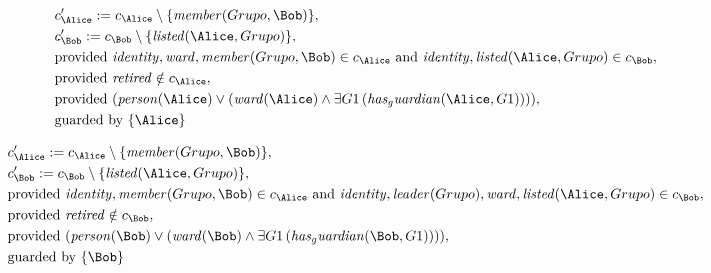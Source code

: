\begin{align*}
&
c'_
{
\Alice
}
 := 
c_
{
\Alice
}
 \setminus 
\{
\mathit{
member
}
(
Grupo
,
\Bob
)
\}
,\\
&
c'_
{
\Bob
}
 := 
c_
{
\Bob
}
 \setminus 
\{
\mathit{
listed
}
(
\Alice
,
Grupo
)
\}
,\\
&
\text{provided } 
\mathit{
identity
}
,
\mathit{
ward
}
,
\mathit{
member
}
(
Grupo
,
\Bob
)
 \in c_
{
\Alice
}
 \text{ and } 
\mathit{
identity
}
,
\mathit{
listed
}
(
\Alice
,
Grupo
)
 \in c_
{
\Bob
}
,\\
&
\text{provided } 
\mathit{
retired
}
 \notin c_
{
\Alice
}
,\\
&
\text{provided } 
(
\mathit{
person
}
(
\Alice
)
\lor
(
\mathit{
ward
}
(
\Alice
)
\land
\exists 
G1
\,(
\mathit{
has_guardian
}
(
\Alice
,
G1
)
)
)
)
,\\
&
\text{guarded by } \{
\Alice
\}
\end{align*}

\begin{align*}
&
c'_
{
\Alice
}
 := 
c_
{
\Alice
}
 \setminus 
\{
\mathit{
member
}
(
Grupo
,
\Bob
)
\}
,\\
&
c'_
{
\Bob
}
 := 
c_
{
\Bob
}
 \setminus 
\{
\mathit{
listed
}
(
\Alice
,
Grupo
)
\}
,\\
&
\text{provided } 
\mathit{
identity
}
,
\mathit{
member
}
(
Grupo
,
\Bob
)
 \in c_
{
\Alice
}
 \text{ and } 
\mathit{
identity
}
,
\mathit{
leader
}
(
Grupo
)
,
\mathit{
ward
}
,
\mathit{
listed
}
(
\Alice
,
Grupo
)
 \in c_
{
\Bob
}
,\\
&
\text{provided } 
\mathit{
retired
}
 \notin c_
{
\Bob
}
,\\
&
\text{provided } 
(
\mathit{
person
}
(
\Bob
)
\lor
(
\mathit{
ward
}
(
\Bob
)
\land
\exists 
G1
\,(
\mathit{
has_guardian
}
(
\Bob
,
G1
)
)
)
)
,\\
&
\text{guarded by } \{
\Bob
\}
\end{align*}
